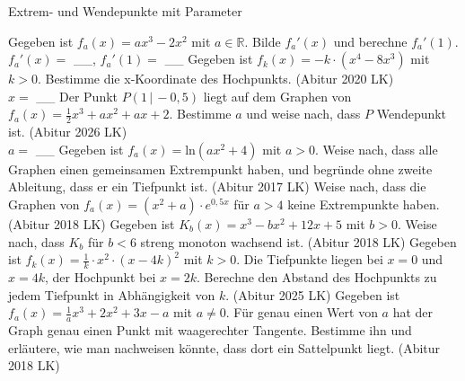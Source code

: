 \setcounter{aufgabe}{13}

\begin{aufgabe}{Extrem- und Wendepunkte mit Parameter}
\begin{teile}
\teil Gegeben ist $f_a(x) = a x^3 - 2x^2$ mit $a \in \mathbb{R}$. Bilde $f_a'(x)$ und berechne $f_a'(1)$. $f_a'(x) =$ \_\_, $f_a'(1) =$ \_\_
\teil Gegeben ist $f_k(x) = -k \cdot (x^4 - 8x^3)$ mit $k > 0$. Bestimme die x-Koordinate des Hochpunkts. \hfill (Abitur 2020 LK) \\ $x =$ \_\_
\teil Der Punkt $P(1 \,|\, -0{,}5)$ liegt auf dem Graphen von $f_a(x) = \frac{1}{2}x^3 + a x^2 + a x + 2$. Bestimme $a$ und weise nach, dass $P$ Wendepunkt ist. \hfill (Abitur 2026 LK) \\ $a =$ \_\_
\teil Gegeben ist $f_a(x) = \mathrm{ln}(a x^2 + 4)$ mit $a > 0$. Weise nach, dass alle Graphen einen gemeinsamen Extrempunkt haben, und begründe ohne zweite Ableitung, dass er ein Tiefpunkt ist. \hfill (Abitur 2017 LK)
\teil Weise nach, dass die Graphen von $f_a(x) = (x^2 + a) \cdot e^{0{,}5x}$ für $a > 4$ keine Extrempunkte haben. \hfill (Abitur 2018 LK)
\teil Gegeben ist $K_b(x) = x^3 - b x^2 + 12x + 5$ mit $b > 0$. Weise nach, dass $K_b$ für $b < 6$ streng monoton wachsend ist. \hfill (Abitur 2018 LK)
\teil Gegeben ist $f_k(x) = \frac{1}{k} \cdot x^2 \cdot (x - 4k)^2$ mit $k > 0$. Die Tiefpunkte liegen bei $x = 0$ und $x = 4k$, der Hochpunkt bei $x = 2k$. Berechne den Abstand des Hochpunkts zu jedem Tiefpunkt in Abhängigkeit von $k$. \hfill (Abitur 2025 LK)
\teil Gegeben ist $f_a(x) = \frac{1}{a}x^3 + 2x^2 + 3x - a$ mit $a \neq 0$. Für genau einen Wert von $a$ hat der Graph genau einen Punkt mit waagerechter Tangente. Bestimme ihn und erläutere, wie man nachweisen könnte, dass dort ein Sattelpunkt liegt. \hfill (Abitur 2018 LK)
\end{teile}
\end{aufgabe}

